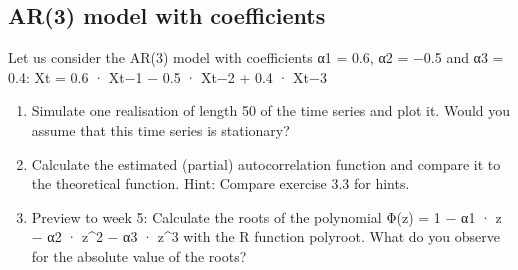 \documentclass[
]{article}
\begin{document}
\hypertarget{ar3-model-with-coefficients}{%
\subsection{AR(3) model with
coefficients}\label{ar3-model-with-coefficients}}

Let us consider the AR(3) model with coefficients α1 = 0.6, α2 = −0.5
and α3 = 0.4: Xt = 0.6 · Xt−1 − 0.5 · Xt−2 + 0.4 · Xt−3

\begin{enumerate}
\def\labelenumi{\alph{enumi})}
\item
  Simulate one realisation of length 50 of the time series and plot it.
  Would you assume that this time series is stationary?
\item
  Calculate the estimated (partial) autocorrelation function and compare
  it to the theoretical function. Hint: Compare exercise 3.3 for hints.
\item
  Preview to week 5: Calculate the roots of the polynomial Φ(z) = 1 − α1
  · z − α2 · z\^{}2 − α3 · z\^{}3 with the R function polyroot. What do
  you observe for the absolute value of the roots?
\end{enumerate}
\end{document}
